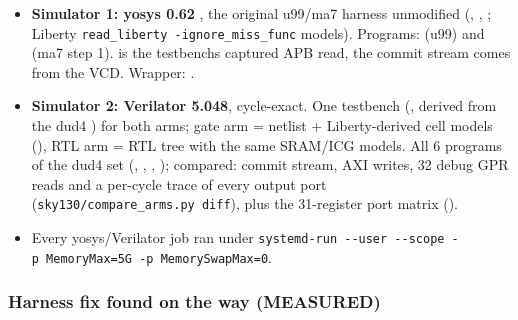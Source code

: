 \begin{record}

\begin{itemize}
\tightlist
\item
  \textbf{Simulator 1: yosys 0.62 }, the original u99/ma7
  harness unmodified (,
  , ;
  Liberty
  \texttt{read\_\allowbreak{}liberty\ -\allowbreak{}ignore\_\allowbreak{}miss\_\allowbreak{}func}
  models). Programs:  (u99) and 
  (ma7 step 1).  is the testbench\textquotesingle s
  captured APB read, the commit stream comes from the VCD. Wrapper:
  .
\item
  \textbf{Simulator 2: Verilator 5.048}, cycle-exact. One testbench
  (, derived from the dud4
  ) for both arms; gate arm = netlist +
  Liberty-derived cell models (), RTL arm =
  RTL tree with the same SRAM/ICG models. All 6 programs of the dud4 set
  (, , ,
  ); compared: commit stream, AXI writes, 32 debug GPR
  reads and a per-cycle trace of every output port
  (\texttt{sky130/\allowbreak{}compare\_\allowbreak{}arms.\allowbreak{}py\ diff}),
  plus the 31-register port matrix ().
\item
  Every yosys/\allowbreak{}Verilator job ran under
  \texttt{systemd-\allowbreak{}run\ -\allowbreak{}-\allowbreak{}user\ -\allowbreak{}-\allowbreak{}scope\ -\allowbreak{}p\ MemoryMax=\allowbreak{}5G\ -\allowbreak{}p\ MemorySwapMax=\allowbreak{}0}.
\end{itemize}

\end{record}

\subsubsection{Harness fix found on the way (MEASURED)}\label{cr:defect:asap7-cpu-synlig-ma7:harness-fix-found-on-the-way-measured}

